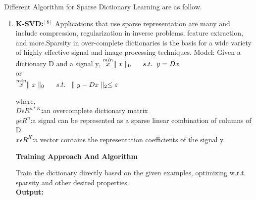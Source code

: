 \documentclass[journal]{IEEEtran}
\begin{document}
	Different Algorithm for Sparse Dictionary Learning are as
	follow.
	\begin{enumerate}
		\item \textbf{K-SVD:}$^{[8]}$
		Applications that use sparse representation are many and include compression, regularization in inverse problems, feature extraction, and more.Sparsity in over-complete dictionaries is the basis for a wide variety of highly effective signal and image processing techniques.
		Model: Given a dictionary D and a signal y,
			$ \stackrel{min}{x}\parallel x \parallel_0 \hspace{0.5cm} s.t.\hspace{0.2cm} y=Dx $\\
				or\\
			$ \stackrel{min}{x}\parallel x \parallel_0 \hspace{0.5cm} s.t.\hspace{0.2cm} \parallel y-Dx \parallel_2\le \varepsilon $
			

		where,\\
		
		\textbf{$D \epsilon R^{n * K}$:}an overcomplete dictionary matrix \\
		\textbf{$y \epsilon R^n$}:a signal can be represented as a sparse linear
		combination of columns of D \\
		\textbf{$x \epsilon R^K$}:a vector contains the representation
		coefficients of the signal y.
		
		\textbf{Training Approach And Algorithm}
		
		Train the dictionary directly based on the given examples, optimizing w.r.t. sparsity and other desired properties.\\
			
		\textbf{Output:}\\
		\begin{minipage}{\linewidth}
			

\end{minipage}
\end{enumerate}
\end{document}
